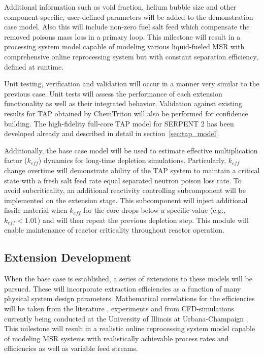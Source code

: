 Additional information such as void fraction, helium 
bubble size and other component-specific, user-defined 
parameters will be added to the demonstration case model.
Also this will include non-zero fuel salt feed which 
compensate the removed poisons mass loss in a primary loop.
This milestone will result in a processing system model capable of 
modeling various liquid-fueled \gls{MSR} with comprehensive 
online reprocessing system but with constant separation efficiency, 
defined at runtime.

Unit testing, verification and validation will occur in a manner 
very similar to the previous case. Unit tests will assess the 
performance of each extension functionality as well as their 
integrated behavior. Validation against existing results for 
\gls{TAP} obtained by ChemTriton \cite{betzler_two-dimensional_2017, 
betzler_molten_2017} will also be performed for confidence 
building. The high-fidelity full-core \gls{TAP} model for 
SERPENT 2 has been developed already and described in detail 
in section~\ref{sec:tap_model}.

Additionally, the base case model will be used to estimate effective 
multiplication factor ($k_{eff}$) dynamics for long-time 
depletion simulations. Particularly, $k_{eff}$ change overtime 
will demonstrate 
ability of the \gls{TAP} system to maintain a critical state with a
fresh salt feed rate equal separated neutron poison loss rate. 
To avoid subcriticality, an additional reactivity 
controlling subcomponent will be implemented on the extension stage. 
This subcomponent 
will inject additional fissile material 
when $k_{eff}$ for the core drops below a specific value (e.g., 
$k_{eff}<1.01$) and will then repeat the previous depletion step. 
This module will enable maintenance of reactor criticality 
throughout reactor operation.
 
\subsection{Extension Development}
When the base case is established, a series of extensions to 
these models will be pursued. These will incorporate extraction 
efficiencies as a function of many physical system design 
parameters. Mathematical correlations for the efficiencies will 
be taken from the literature \cite{gabbard_development_1974}, 
experiments and from CFD-simulations currently being conducted at 
the University of Illinois at Urbana-Champaign \cite{huff_enabling_2018}.
This milestone will result in a realistic online reprocessing system 
model capable of modeling \gls{MSR} systems with realistically achievable 
process rates and efficiencies as well as variable feed streams. 

